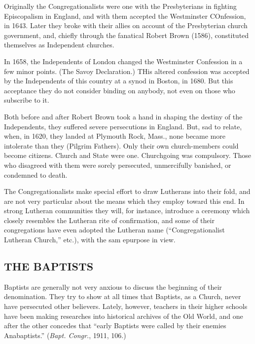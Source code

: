 \documentclass[
]{book}
\begin{document}
Originally the Congregationalists were one with the Presbyterians in fighting Episcopalism in England, and with them accepted the Westminster COnfession, in 1643. Later they broke with their allies on account of the Presbyterian church government, and, chiefly through the fanatical Robert Brown (1586), constituted themselves as Independent churches.

In 1658, the Independents of London changed the Westminster Confession in a few minor points. (The Savoy Declaration.) THis altered confession was accepted by the Independents of this country at a synod in Boston, in 1680. But this acceptance they do not consider binding on anybody, not even on those who subscribe to it.

Both before and after Robert Brown took a hand in shaping the destiny of the Independents, they suffered severe persecutions in England. But, sad to relate, when, in 1620, they landed at Plymouth Rock, Mass., none became more intolerate than they (Pilgrim Fathers). Only their own church-members could become citizens. Church and State were one. Churchgoing was compulsory. Those who disagreed with them were sorely persecuted, unmercifully banished, or condemned to death.

The Congregationalists make special effort to draw Lutherans into their fold, and are not very particular about the means which they employ toward this end. In strong Lutheran communities they will, for instance, introduce a ceremony which closely resembles the Lutheran rite of confirmation, and some of their congregations have even adopted the Lutheran name (``Congregationalist Lutheran Church,'' etc.), with the sam epurpose in view.

\hypertarget{the-baptists}{%
\subsection{THE BAPTISTS}\label{the-baptists}}

Baptists are generally not very anxious to discuss the beginning of their denomination. They try to show at all times that Baptists, as a Church, never have persecuted other believers. Lately, however, teachers in their higher schools have been making researches into historical archives of the Old World, and one after the other concedes that ``early Baptists were called by their enemies Anabaptists.'' (\emph{Bapt. Congr.}, 1911, 106.)
\end{document}
